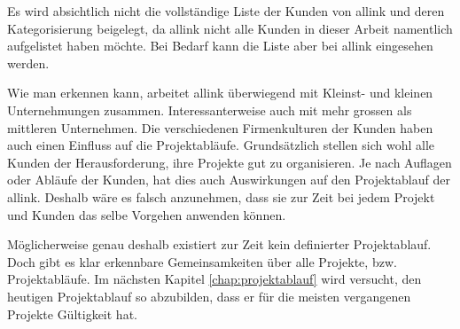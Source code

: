 Es wird absichtlich nicht die vollständige Liste der Kunden von allink und deren 
Kategorisierung beigelegt, da allink nicht alle Kunden in dieser Arbeit namentlich 
aufgelistet haben möchte. Bei Bedarf kann die Liste aber bei allink eingesehen werden.

Wie man erkennen kann, arbeitet allink überwiegend mit Kleinst- und kleinen 
Unternehmungen zusammen. Interessanterweise auch mit mehr grossen als mittleren
Unternehmen. Die verschiedenen Firmenkulturen der Kunden haben auch einen 
Einfluss auf die Projektabläufe. Grundsätzlich stellen sich wohl alle Kunden
der Herausforderung, ihre Projekte gut zu organisieren. Je nach Auflagen oder
Abläufe der Kunden, hat dies auch Auswirkungen auf den Projektablauf der allink.
Deshalb wäre es falsch anzunehmen, dass sie zur Zeit bei jedem Projekt und 
Kunden das selbe Vorgehen anwenden können.

Möglicherweise genau deshalb existiert zur Zeit kein definierter Projektablauf. 
Doch gibt es klar erkennbare Gemeinsamkeiten über alle Projekte, bzw. Projektabläufe.
Im nächsten Kapitel \ref{chap:projektablauf} wird versucht, den heutigen Projektablauf so 
abzubilden, dass er für die meisten vergangenen Projekte Gültigkeit hat.
